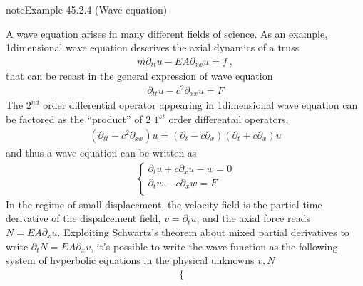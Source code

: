 \documentclass[letterpaper,10pt,english]{jupyterBook}
\begin{document}
\begin{sphinxadmonition}{note}{Example 45.2.4 (Wave equation)}



\sphinxAtStartPar
A wave equation arises in many different fields of science. As an example, 1\sphinxhyphen{}dimensional wave equation descrives the axial dynamics of a truss
\begin{equation*}
\begin{split}m \partial_{tt} u - EA \partial_{xx} u = f \ ,\end{split}
\end{equation*}
\sphinxAtStartPar
that can be recast in the general expression of wave equation
\begin{equation*}
\begin{split}\partial_{tt} u - c^2 \partial_{xx} u = F\end{split}
\end{equation*}
\sphinxAtStartPar
The \(2^{nd}\) order differential operator appearing in 1\sphinxhyphen{}dimensional wave equation can be factored as the “product” of 2 \(1^{st}\) order differentail operators,
\begin{equation*}
\begin{split}\left( \partial_{tt} - c^2 \partial_{xx} \right) u = \left( \partial_t - c \partial_x \right) \left( \partial_t + c \partial_x \right) u\end{split}
\end{equation*}
\sphinxAtStartPar
and thus a wave equation can be written as
\begin{equation*}
\begin{split}\begin{cases}
  \partial_t u + c \partial_x u - w = 0 \\
  \partial_t w - c \partial_x w     = F \\
\end{cases}\end{split}
\end{equation*}
\sphinxAtStartPar
In the regime of small displacement, the velocity field is the partial time derivative of the dispalcement field, \(v = \partial_t u\), and the axial force reads \(N = EA \partial_x u\). Exploiting Schwartz’s theorem about mixed partial derivatives to write \(\partial_t N = EA \partial_x v\), it’s possible to write the wave function as the following system of hyperbolic equations in the physical unknowns \(v, N\)
\begin{equation*}
\begin{split}\begin{cases}

\end{cases}
\end{split}
\end{equation*}
\end{sphinxadmonition}
\end{document}
